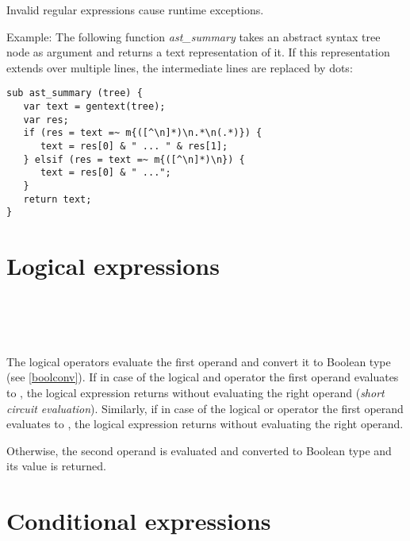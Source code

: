 Invalid regular expressions cause runtime exceptions.

Example: The following function \textit{ast\_summary} takes
an abstract syntax tree node as argument and returns a
text representation of it. If this representation extends over
multiple lines, the intermediate lines are replaced by dots:

\begin{lstlisting}
sub ast_summary (tree) {
   var text = gentext(tree);
   var res;
   if (res = text =~ m{([^\n]*)\n.*\n(.*)}) {
      text = res[0] & " ... " & res[1];
   } elsif (res = text =~ m{([^\n]*)\n}) {
      text = res[0] & " ...";
   }
   return text;
}
\end{lstlisting}

\section{Logical expressions}

\begin{grammar}
      \produces {} \\
      \produces {}
         \lextoken{\&\&}  \\
      \produces {} \\
      \produces {}
         \lextoken{\barSY\barSY} 
\end{grammar}

\noindent
The logical operators evaluate the first operand and convert
it to Boolean type (see \ref{boolconv}). If in case of the
logical and operator \token{\&\&} the first operand evaluates
to , the logical expression returns 
without evaluating the right operand (\textit{short circuit
evaluation}). Similarly, if
in case of the logical or operator \token{\barSY\barSY} the
first operand evaluates to , the logical expression
returns  without evaluating the right operand.

Otherwise, the second operand is evaluated and converted to
Boolean type and its value is returned.

\section{Conditional expressions}

